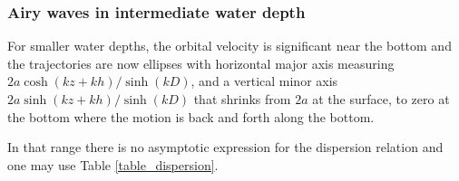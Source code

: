 \subsubsection{Airy waves in intermediate water depth}
For smaller water depths, the orbital velocity is significant near the bottom 
and the trajectories are now ellipses with horizontal major axis measuring 
$2 a
{\cosh\left(kz+kh\right)}/{\sinh\left(kD\right)}$, and 
a vertical minor axis $2 a
{\sinh\left(kz+kh\right)}/{\sinh\left(kD\right)}$ that shrinks from $2a$ at the surface, 
to zero at the bottom where the motion is back and forth along the 
bottom.

In that range there is no asymptotic expression for the dispersion relation and one may use Table \ref{table_dispersion}. 

